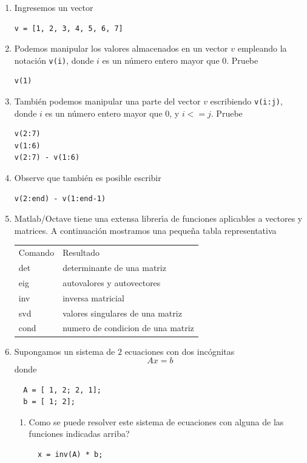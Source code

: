 \begin{enumerate}

\item Ingresemos un vector
\begin{verbatim}
v = [1, 2, 3, 4, 5, 6, 7]
\end{verbatim}

\item Podemos manipular los valores almacenados en un vector $v$ empleando
  la notaci\'{o}n \verb-v(i)-, donde $i$ es un n\'{u}mero entero mayor
  que $0$. Pruebe
\begin{verbatim}
v(1)
\end{verbatim}

\item Tambi\'{e}n podemos manipular una parte del vector $v$
  escribiendo \verb-v(i:j)-, donde $i$ es un n\'{u}mero entero mayor
  que $0$, y $i <= j$. Pruebe
\begin{verbatim}
v(2:7)
v(1:6)
v(2:7) - v(1:6)
\end{verbatim}

\item Observe que tambi\'{e}n es posible escribir
\begin{verbatim}
v(2:end) - v(1:end-1)
\end{verbatim}

\item Matlab/Octave tiene una extensa librer\'{\i}a de funciones aplicables a
vectores y matrices. A continuaci\'{o}n mostramos una peque\~{n}a
tabla representativa
\begin{center}
  \begin{tabular}{ll}
    Comando & Resultado \\
    det & determinante de una matriz \\
    eig & autovalores y autovectores \\
    inv & inversa matricial \\
    svd & valores singulares de una matriz \\
    cond & numero de condicion de una matriz
  \end{tabular}
\end{center}

\item Supongamos un sistema de $2$ ecuaciones con dos inc\'{o}gnitas
\begin{equation}
  Ax=b
\end{equation}
donde 
\begin{verbatim}
  A = [ 1, 2; 2, 1];
  b = [ 1; 2];
\end{verbatim}
\begin{enumerate}
\item Como se puede resolver este sistema de ecuaciones con alguna de
  las funciones indicadas arriba?
\begin{verbatim}
  x = inv(A) * b;
\end{verbatim}


\end{enumerate}
\end{enumerate}
